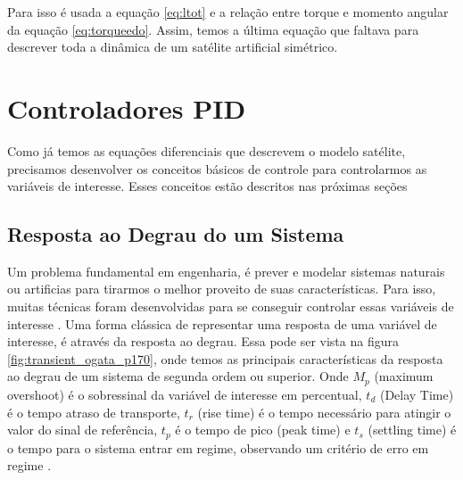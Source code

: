 Para isso é usada a equação \ref{eq:ltot} e a relação entre torque e momento angular da equação \ref{eq:torqueedo}. Assim, temos a última equação que faltava para descrever toda a dinâmica de um satélite artificial simétrico. 



\section{Controladores PID}

Como já temos as equações diferenciais que descrevem o modelo satélite, precisamos desenvolver os conceitos básicos de controle para controlarmos as variáveis de interesse. Esses conceitos estão descritos nas próximas seções



\subsection{Resposta ao Degrau do um Sistema}

Um problema fundamental em engenharia, é prever e modelar sistemas naturais ou artificias para tirarmos o melhor proveito de suas características. Para isso, muitas técnicas foram desenvolvidas para se conseguir controlar essas variáveis de interesse \cite{Levine1996}. Uma forma clássica de representar uma resposta de uma variável de interesse, é através da resposta ao degrau. Essa pode ser vista na figura \ref{fig:transient_ogata_p170}, onde temos as principais características da resposta ao degrau de um sistema de segunda ordem ou superior. Onde \textit{$M_p$} (maximum overshoot) é o sobressinal da variável de interesse em percentual, \textit{$t_d$} (Delay Time) é o tempo atraso de transporte, \textit{$t_r$} (rise time) é o tempo necessário para atingir o valor do sinal de referência, \textit{$t_p$} é o tempo de pico (peak time) e \textit{$t_s$} (settling time) é o tempo para o sistema entrar em regime, observando um critério de erro em regime \cite{Ogata}.

